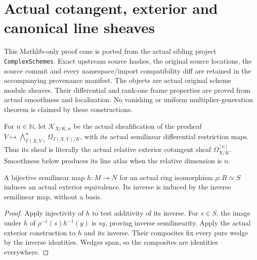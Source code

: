 \section{Actual cotangent, exterior and canonical line sheaves}

This Mathlib-only proof cone is ported from the actual sibling project
\texttt{ComplexSchemes}. Exact upstream source hashes, the original
source locations, the source commit and every namespace/import compatibility
diff are retained in the accompanying provenance manifest. The objects
are actual original scheme module sheaves. Their differential and
rank-one frame properties are proved from actual smoothness and
localization. No vanishing or uniform multiplier-generation theorem
is claimed by these constructions.

\begin{definition}
\label{sc0-canonical-port:can:actual-relative-exterior-canonical-object}
\leanok
For \(n\in\mathbb N\), let \(\mathcal K_{X/K,n}\)
be the actual sheafification of the presheaf
\(V\mapsto\bigwedge^n_{\Gamma(X,V)}\Omega_{\Gamma(X,V)/K}\),
with its actual semilinear differential restriction maps.
Thus its sheaf is literally the actual relative exterior
cotangent sheaf \(\Omega^{[n]}_{X/K}\). Smoothness below
produces its line atlas when the relative dimension is \(n\).
\end{definition}

\begin{theorem}
\label{sc0-canonical-port:can:basis-free-semilinear-exterior-transport}
\leanok
A bijective semilinear map \(h:M\to N\) for an actual ring
isomorphism \(\rho:R\simeq S\) induces an actual exterior equivalence.
Its inverse is induced by the inverse semilinear map, without a basis.
\end{theorem}
\begin{proof}
Apply injectivity of \(h\) to test additivity of its inverse.
For \(s\in S\), the image under \(h\) of
\(\rho^{-1}(s)h^{-1}(y)\) is \(sy\), proving inverse semilinearity.
Apply the actual exterior construction to \(h\) and its inverse.
Their composites fix every pure wedge by the inverse identities.
Wedges span, so the composites are identities everywhere.
\end{proof}

